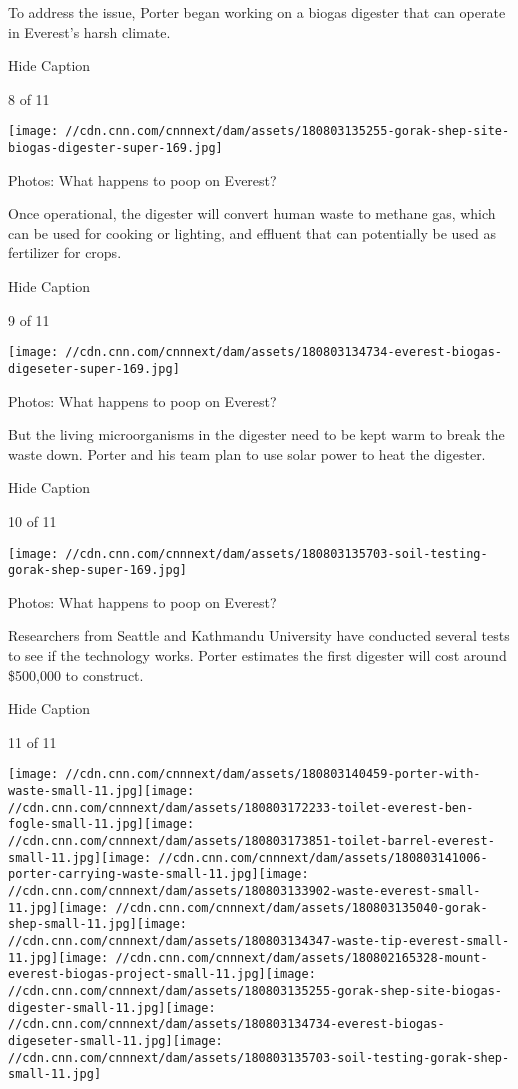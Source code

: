 To address the issue, Porter began working on a biogas digester that can
operate in Everest's harsh climate.

Hide Caption

8 of 11

\texttt{[image: //cdn.cnn.com/cnnnext/dam/assets/180803135255-gorak-shep-site-biogas-digester-super-169.jpg]}

Photos: What happens to poop on Everest?

Once operational, the digester will convert human waste to methane gas,
which can be used for cooking or lighting, and effluent that can
potentially be used as fertilizer for crops.

Hide Caption

9 of 11

\texttt{[image: //cdn.cnn.com/cnnnext/dam/assets/180803134734-everest-biogas-digeseter-super-169.jpg]}

Photos: What happens to poop on Everest?

But the living microorganisms in the digester need to be kept warm to
break the waste down. Porter and his team plan to use solar power to
heat the digester.

Hide Caption

10 of 11

\texttt{[image: //cdn.cnn.com/cnnnext/dam/assets/180803135703-soil-testing-gorak-shep-super-169.jpg]}

Photos: What happens to poop on Everest?

Researchers from Seattle and Kathmandu University have conducted several
tests to see if the technology works. Porter estimates the first
digester will cost around \$500,000 to construct.

Hide Caption

11 of 11

\texttt{[image: //cdn.cnn.com/cnnnext/dam/assets/180803140459-porter-with-waste-small-11.jpg]}\texttt{[image: //cdn.cnn.com/cnnnext/dam/assets/180803172233-toilet-everest-ben-fogle-small-11.jpg]}\texttt{[image: //cdn.cnn.com/cnnnext/dam/assets/180803173851-toilet-barrel-everest-small-11.jpg]}\texttt{[image: //cdn.cnn.com/cnnnext/dam/assets/180803141006-porter-carrying-waste-small-11.jpg]}\texttt{[image: //cdn.cnn.com/cnnnext/dam/assets/180803133902-waste-everest-small-11.jpg]}\texttt{[image: //cdn.cnn.com/cnnnext/dam/assets/180803135040-gorak-shep-small-11.jpg]}\texttt{[image: //cdn.cnn.com/cnnnext/dam/assets/180803134347-waste-tip-everest-small-11.jpg]}\texttt{[image: //cdn.cnn.com/cnnnext/dam/assets/180802165328-mount-everest-biogas-project-small-11.jpg]}\texttt{[image: //cdn.cnn.com/cnnnext/dam/assets/180803135255-gorak-shep-site-biogas-digester-small-11.jpg]}\texttt{[image: //cdn.cnn.com/cnnnext/dam/assets/180803134734-everest-biogas-digeseter-small-11.jpg]}\texttt{[image: //cdn.cnn.com/cnnnext/dam/assets/180803135703-soil-testing-gorak-shep-small-11.jpg]}

